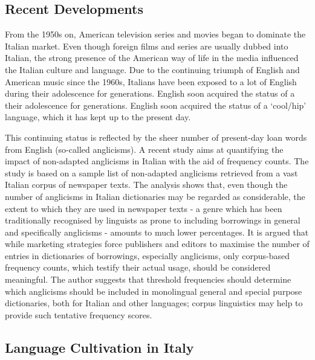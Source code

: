 \documentclass[]{../../metanetpaper}
\begin{document}
\begin{multicols}{2}
\subsection{Recent Developments}

From the 1950s on, American television series and movies began to dominate the
Italian market. Even though foreign films and series are usually dubbed into
Italian, the strong presence of the American way of life in the media
influenced the Italian culture and language. Due to the continuing triumph of
English and American music since the 1960s, Italians have been exposed to a
lot of English during their adolescence for generations. English soon acquired
the status of a  their adolescence for generations. English soon acquired
the status of a `cool/hip' language, which it has kept up to the present
day.

This continuing status is reflected by the sheer number of present-day loan
words from English (so-called anglicisms). A recent study \cite{Fischer} aims
at quantifying the impact of non-adapted anglicisms in Italian with the aid of
frequency counts. The study is based on a sample list of non-adapted anglicisms
retrieved from a vast Italian corpus of newspaper texts. The analysis shows
that, even though the number of anglicisms in Italian dictionaries may be
regarded as considerable, the extent to which they are used in newspaper texts
- a genre which has been traditionally recognised by linguists as prone to
including borrowings in general and specifically anglicisms - amounts to much
lower percentages. It is argued that while marketing strategies force
publishers and editors to maximise the number of entries in dictionaries of
borrowings, especially anglicisms, only corpus-based frequency counts, which
testify their actual usage, should be considered meaningful. The author
suggests that threshold frequencies should determine which anglicisms should
be included in monolingual general and special purpose dictionaries, both for
Italian and other languages; corpus linguistics may help to provide such
tentative frequency scores.




\subsection{Language Cultivation in Italy}


\end{multicols}
\end{document}
